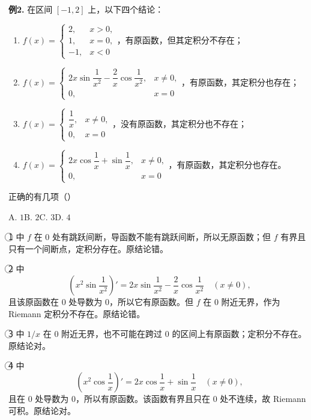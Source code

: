\begin{problemblock}
\textbf{例2.} 在区间 \([-1,2]\) 上，以下四个结论：
\begin{enumerate}[label=\textcircled{\arabic*}, leftmargin=2.2em]
\item \(
f(x)=\begin{cases}
2,&x>0,\\
1,&x=0,\\
-1,&x<0
\end{cases}
\)，有原函数，但其定积分不存在；
\item \(
f(x)=\begin{cases}
2x\sin\dfrac1{x^2}-\dfrac2x\cos\dfrac1{x^2},&x\ne0,\\
0,&x=0
\end{cases}
\)，有原函数，其定积分也存在；
\item \(
f(x)=\begin{cases}
\dfrac1x,&x\ne0,\\
0,&x=0
\end{cases}
\)，没有原函数，其定积分也不存在；
\item \(
f(x)=\begin{cases}
2x\cos\dfrac1x+\sin\dfrac1x,&x\ne0,\\
0,&x=0
\end{cases}
\)，有原函数，其定积分也存在。
\end{enumerate}
正确的有几项（\quad）

A. \(1\)\qquad B. \(2\)\qquad C. \(3\)\qquad D. \(4\)
\end{problemblock}
\begin{solutionblock}
\textcircled{1} 中 \(f\) 在 \(0\) 处有跳跃间断，导函数不能有跳跃间断，所以无原函数；但 \(f\) 有界且只有一个间断点，定积分存在。原结论错。

\textcircled{2} 中
\[
\left(x^2\sin\frac1{x^2}\right)'
=2x\sin\frac1{x^2}-\frac2x\cos\frac1{x^2}\quad (x\ne0),
\]
且该原函数在 \(0\) 处导数为 \(0\)，所以它有原函数。但 \(f\) 在 \(0\) 附近无界，作为 Riemann 定积分不存在。原结论错。

\textcircled{3} 中 \(1/x\) 在 \(0\) 附近无界，也不可能在跨过 \(0\) 的区间上有原函数；定积分不存在。原结论对。

\textcircled{4} 中
\[
\left(x^2\cos\frac1x\right)'
=2x\cos\frac1x+\sin\frac1x\quad (x\ne0),
\]
且在 \(0\) 处导数为 \(0\)，所以有原函数。该函数有界且只在 \(0\) 处不连续，故 Riemann 可积。原结论对。
\end{solutionblock}

